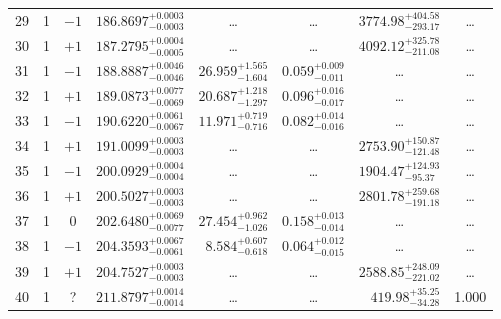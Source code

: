 \begin{table*}[!]
\begin{tabular}{llcrrlrc}
29 & 1 & $-1$ & $    186.8697_{-      0.0003}^{+      0.0003}$ & \multicolumn{1}{c}{\dots} & \multicolumn{1}{c}{\dots} & $     3774.98_{-      293.17}^{+      404.58}$ & \dots \\[1pt]
30 & 1 & $+1$ & $    187.2795_{-      0.0005}^{+      0.0004}$ & \multicolumn{1}{c}{\dots} & \multicolumn{1}{c}{\dots} & $     4092.12_{-      211.08}^{+      325.78}$ & \dots \\[1pt]
31 & 1 & $-1$ & $    188.8887_{-      0.0046}^{+      0.0046}$ & $      26.959_{-       1.604}^{+       1.565}$ & $       0.059_{-       0.011}^{+       0.009}$ & \multicolumn{1}{c}{\dots} & \dots \\[1pt]
32 & 1 & $+1$ & $    189.0873_{-      0.0069}^{+      0.0077}$ & $      20.687_{-       1.297}^{+       1.218}$ & $       0.096_{-       0.017}^{+       0.016}$ & \multicolumn{1}{c}{\dots} & \dots \\[1pt]
33 & 1 & $-1$ & $    190.6220_{-      0.0067}^{+      0.0061}$ & $      11.971_{-       0.716}^{+       0.719}$ & $       0.082_{-       0.016}^{+       0.014}$ & \multicolumn{1}{c}{\dots} & \dots \\[1pt]
34 & 1 & $+1$ & $    191.0099_{-      0.0003}^{+      0.0003}$ & \multicolumn{1}{c}{\dots} & \multicolumn{1}{c}{\dots} & $     2753.90_{-      121.48}^{+      150.87}$ & \dots \\[1pt]

35 & 1 & $-1$ & $    200.0929_{-      0.0004}^{+      0.0004}$ & \multicolumn{1}{c}{\dots} & \multicolumn{1}{c}{\dots} & $     1904.47_{-       95.37}^{+      124.93}$ & \dots \\[1pt]
36 & 1 & $+1$ & $    200.5027_{-      0.0003}^{+      0.0003}$ & \multicolumn{1}{c}{\dots} & \multicolumn{1}{c}{\dots} & $     2801.78_{-      191.18}^{+      259.68}$ & \dots \\[1pt]
37 & 1 & 0 & $    202.6480_{-      0.0077}^{+      0.0069}$ & $      27.454_{-       1.026}^{+       0.962}$ & $       0.158_{-       0.014}^{+       0.013}$ & \multicolumn{1}{c}{\dots} & \dots \\[1pt]
38 & 1 & $-1$ & $    204.3593_{-      0.0061}^{+      0.0067}$ & $       8.584_{-       0.618}^{+       0.607}$ & $       0.064_{-       0.015}^{+       0.012}$ & \multicolumn{1}{c}{\dots} & \dots \\[1pt]
39 & 1 & $+1$ & $    204.7527_{-      0.0003}^{+      0.0003}$ & \multicolumn{1}{c}{\dots} & \multicolumn{1}{c}{\dots} & $     2588.85_{-      221.02}^{+      248.09}$ & \dots \\[1pt]
40 & 1 & ? & $    211.8797_{-      0.0014}^{+      0.0014}$ & \multicolumn{1}{c}{\dots} & \multicolumn{1}{c}{\dots} & $      419.98_{-       34.28}^{+       35.25}$ & 1.000\\[1pt]


\end{tabular}
\end{table*}
